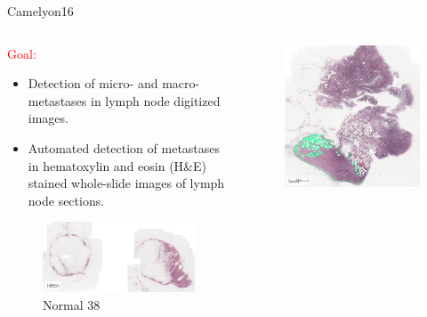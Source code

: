 \documentclass{beamer}
\begin{document}
\begin{frame}{Camelyon16}

\begin{columns}[T] %
\begin{column}{.50\textwidth}
\begin{small}
\textcolor{red}{Goal:}
\begin{itemize}
\item Detection of micro- and macro-metastases in lymph node digitized images.
\item Automated detection of metastases in hematoxylin and eosin (H\&E) stained whole-slide images of lymph node sections.
\end{itemize}
\end{small}
\begin{figure}[!ht]
\centering
\includegraphics[width=\textwidth]{Normal_38.png}
\caption{Normal 38}
\label{normal_38}
\end{figure}
\end{column}%
\hfill%
\begin{column}{.50\textwidth}
\begin{figure}[!ht]
\centering
\includegraphics[width=\textwidth]{Tumor_34.png}

\end{figure}
\end{column}
\end{columns}
\end{frame}
\end{document}
